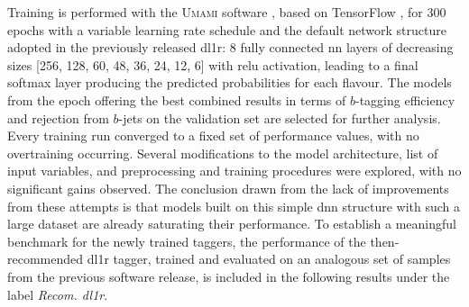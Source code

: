 
Training is performed with the \textsc{Umami} software \cite{UmamiCite}, based on TensorFlow \cite{tensorflow2015-whitepaper}, for 300 epochs with a variable learning rate schedule and the default network structure adopted in the previously released \gls{dl1r}: 8 fully connected \gls{nn} layers of decreasing sizes [256, 128, 60, 48, 36, 24, 12, 6] with \gls{relu} activation, leading to a final softmax layer producing the predicted probabilities for each flavour. The models from the epoch offering the best combined results in terms of $b$-tagging efficiency and rejection from $b$-jets on the validation set are selected for further analysis. Every training run converged to a fixed set of performance values, with no overtraining occurring. Several modifications to the model architecture, list of input variables, and preprocessing and training procedures were explored, with no significant gains observed. The conclusion drawn from the lack of improvements from these attempts is that models built on this simple \gls{dnn} structure with such a large dataset are already saturating their performance. To establish a meaningful benchmark for the newly trained taggers, the performance of the then-recommended \gls{dl1r} tagger, trained and evaluated on an analogous set of samples from the previous software release, is included in the following results under the label \textit{Recom. \gls{dl1r}}.

